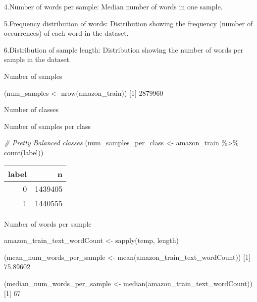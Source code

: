 \documentclass[
]{article}
\newenvironment{Shaded}{}{}
\newcommand{\CommentTok}[1]{\textcolor[rgb]{0.38,0.63,0.69}{\textit{#1}}}
\newcommand{\DecValTok}[1]{\textcolor[rgb]{0.25,0.63,0.44}{#1}}
\newcommand{\FloatTok}[1]{\textcolor[rgb]{0.25,0.63,0.44}{#1}}
\newcommand{\FunctionTok}[1]{\textcolor[rgb]{0.02,0.16,0.49}{#1}}
\newcommand{\NormalTok}[1]{#1}
\newcommand{\OtherTok}[1]{\textcolor[rgb]{0.00,0.44,0.13}{#1}}
\newcommand{\SpecialCharTok}[1]{\textcolor[rgb]{0.25,0.44,0.63}{#1}}
\begin{document}
4.Number of words per sample: Median number of words in one sample.

5.Frequency distribution of words: Distribution showing the frequency
(number of occurrences) of each word in the dataset.

6.Distribution of sample length: Distribution showing the number of
words per sample in the dataset.

Number of samples

\begin{Shaded}
\begin{Highlighting}[]
\NormalTok{(num\_samples }\OtherTok{\textless{}{-}} \FunctionTok{nrow}\NormalTok{(amazon\_train))}
\NormalTok{[}\DecValTok{1}\NormalTok{] }\DecValTok{2879960}
\end{Highlighting}
\end{Shaded}

Number of classes

\begin{Shaded}
\end{Shaded}

Number of samples per class

\begin{Shaded}
\begin{Highlighting}[]
\CommentTok{\# Pretty Balanced classes}
\NormalTok{(num\_samples\_per\_class }\OtherTok{\textless{}{-}}\NormalTok{ amazon\_train }\SpecialCharTok{\%\textgreater{}\%}
    \FunctionTok{count}\NormalTok{(label))}
\end{Highlighting}
\end{Shaded}

\begin{tabular}{r|r}
\hline
label & n\\
\hline
0 & 1439405\\
\hline
1 & 1440555\\
\hline
\end{tabular}

Number of words per sample

\begin{Shaded}
\begin{Highlighting}[]
\NormalTok{amazon\_train\_text\_wordCount }\OtherTok{\textless{}{-}} \FunctionTok{sapply}\NormalTok{(temp, length)}

\NormalTok{(mean\_num\_words\_per\_sample }\OtherTok{\textless{}{-}} \FunctionTok{mean}\NormalTok{(amazon\_train\_text\_wordCount))}
\NormalTok{[}\DecValTok{1}\NormalTok{] }\FloatTok{75.89602}

\NormalTok{(median\_num\_words\_per\_sample }\OtherTok{\textless{}{-}} \FunctionTok{median}\NormalTok{(amazon\_train\_text\_wordCount))}
\NormalTok{[}\DecValTok{1}\NormalTok{] }\DecValTok{67}
\end{Highlighting}
\end{Shaded}
\end{document}
